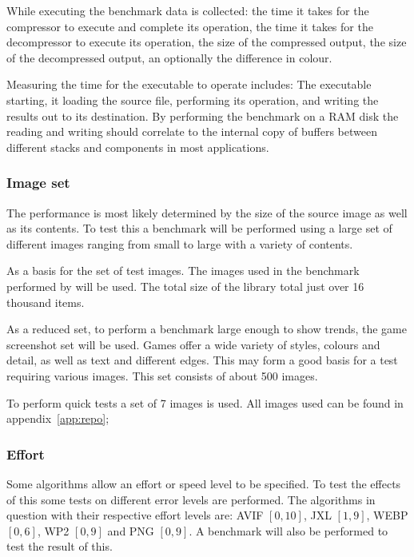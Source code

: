 \documentclass[11pt,a4paper]{report}
\begin{document}
While executing the benchmark data is collected: the time it takes for the compressor to execute and complete its operation, the time it takes for the decompressor to execute its operation, the size of the compressed output, the size of the decompressed output, an optionally the difference in colour.

Measuring the time for the executable to operate includes: The executable starting, it loading the source file, performing its operation, and writing the results out to its destination. By performing the benchmark on a RAM disk the reading and writing should correlate to the internal copy of buffers between different stacks and components in most applications.

\subsubsection{\label{mediumgrandtest}Image set}

The performance is most likely determined by the size of the source image as well as its contents. To test this a benchmark will be performed using a large set of different images ranging from small to large with a variety of contents.

As a basis for the set of test images. The images used in the benchmark performed by \cite{anonjxl} will be used. The total size of the library total just over 16 thousand items.

As a reduced set, to perform a benchmark large enough to show trends, the game screenshot set will be used. Games offer a wide variety of styles, colours and detail, as well as text and different edges. This may form a good basis for a test requiring various images. This set consists of about 500 images.

To perform quick tests a set of 7 images is used. All images used can be found in appendix~\ref{app:repo};

\subsubsection{Effort}

Some algorithms allow an effort or speed level to be specified. To test the effects of this some tests on different error levels are performed. The algorithms in question with their respective effort levels are: AVIF $[0,10]$, JXL $[1,9]$, WEBP $[0,6]$, WP2 $[0,9]$ and PNG $[0,9]$. A benchmark will also be performed to test the result of this.
\end{document}
